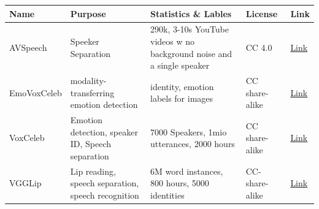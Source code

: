 \begin{longtable}[]{@{}p{}p{}p{}p{}p{}@{}}
\toprule
Name & Purpose & Statistics \& Lables & License & Link\tabularnewline
\midrule
\endhead
AVSpeech & Speeker Separation & 290k, 3-10s YouTube videos w no
background noise and a single speaker & CC 4.0 &
\href{https://looking-to-listen.github.io/avspeech/index.html}{Link}\tabularnewline
EmoVoxCeleb & modality-transferring emotion detection & identity,
emotion labels for images & CC share-alike &
\href{http://www.robots.ox.ac.uk/~vgg/research/cross-modal-emotions/}{Link}\tabularnewline
VoxCeleb & Emotion detection, speaker ID, Speech separation & 7000
Speakers, 1mio utterances, 2000 hours & CC share-alike &
\href{http://www.robots.ox.ac.uk/~vgg/data/voxceleb/index.html\#portfolio}{Link}\tabularnewline
VGGLip & Lip reading, speech separation, speech recognition & 6M word
instances, 800 hours, 5000 identities & CC-share-alike &
\href{http://www.robots.ox.ac.uk/~vgg/data/lip_reading/}{Link}\tabularnewline
\bottomrule
\end{longtable}